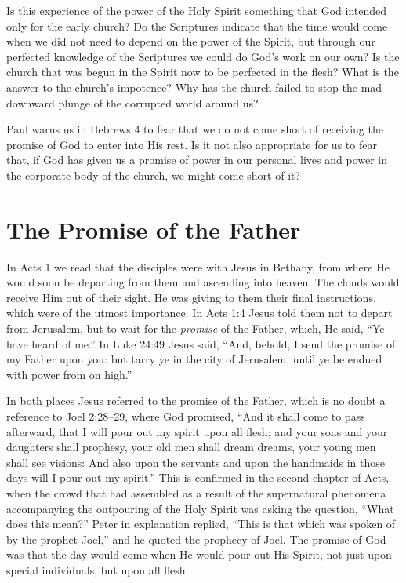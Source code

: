 Is this experience of the power of the Holy Spirit something
that God intended only for the early church? Do the
Scriptures indicate that the time would come when we did
not need to depend on the power of the Spirit, but through
our perfected knowledge of the Scriptures we could do
God’s work on our own? Is the church that was begun in the
Spirit now to be perfected in the flesh? What is the answer
to the church’s impotence? Why has the church failed to
stop the mad downward plunge of the corrupted world
around us?

Paul warns us in Hebrews 4 to fear that we do not come
short of receiving the promise of God to enter into His rest.
Is it not also appropriate for us to fear that, if God has given
us a promise of power in our personal lives and power in
the corporate body of the church, we might come short of
it?


\section*{The Promise of the Father}

In Acts 1 we read that the disciples were with Jesus
in Bethany, from where He would soon be departing from
them and ascending into heaven. The clouds would receive
Him out of their sight. He was giving to them their final
instructions, which were of the utmost importance. In Acts
1:4 Jesus told them not to depart from Jerusalem, but to wait
for the \emph{promise} of the Father, which, He said, “Ye have heard
of me.” In Luke 24:49 Jesus said, “And, behold, I send the
promise of my Father upon you: but tarry ye in the city of
Jerusalem, until ye be endued with power from on high.”

In both places Jesus referred to the promise of the Father,
which is no doubt a reference to Joel 2:28–29, where God
promised, “And it shall come to pass afterward, that I
will pour out my spirit upon all flesh; and your sons and
your daughters shall prophesy, your old men shall dream
dreams, your young men shall see visions: And also upon
the servants and upon the handmaids in those days will I
pour out my spirit.” This is confirmed in the second chapter
of Acts, when the crowd that had assembled as a result of
the supernatural phenomena accompanying the outpouring
of the Holy Spirit was asking the question, “What does
this mean?” Peter in explanation replied, “This is that which
was spoken of by the prophet Joel,” and he quoted the
prophecy of Joel. The promise of God was that the day
would come when He would pour out His Spirit, not just
upon special individuals, but upon all flesh.


